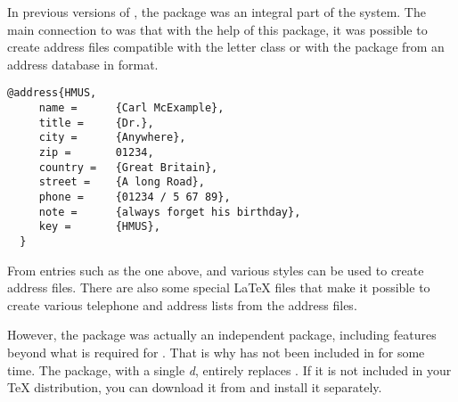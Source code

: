 In previous versions of \KOMAScript{}, the  package was an
integral part of the \KOMAScript{} system.  The main connection to
\KOMAScript{} was that with the help of this package, it was possible to
create address files compatible with the \KOMAScript{} letter class or with
the  package from an address database in \BibTeX{} format.

\begin{lstlisting}[morekeywords={@address}]
  @address{HMUS,
     name =      {Carl McExample},
     title =     {Dr.},
     city =      {Anywhere},
     zip =       01234,
     country =   {Great Britain},
     street =    {A long Road},
     phone =     {01234 / 5 67 89},
     note =      {always forget his birthday},
     key =       {HMUS},
  }
\end{lstlisting}

From entries such as the one above, \BibTeX{} and various {\BibTeX} styles can
be used to create address files. There are also some special \LaTeX{} files
that make it possible to create various telephone and address lists from the
address files.

However, the  package was actually an independent package,
including features beyond what is required for \KOMAScript{}. That is why
 has not been included in \KOMAScript{} for some time. The
 package, with a single \emph{d}, entirely replaces
. If it is not included in your \TeX{} distribution, you can
download it from \cite{package:adrconv} and install it separately.

